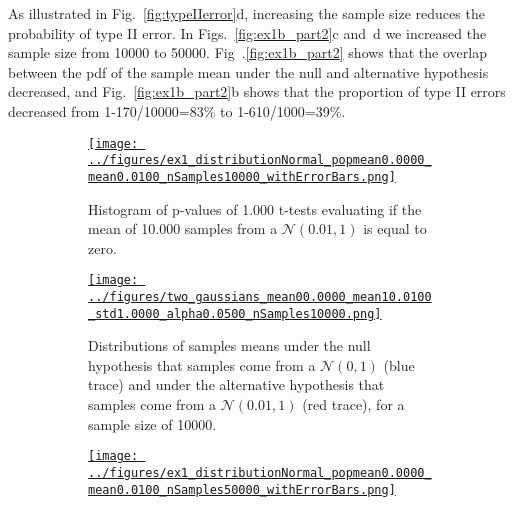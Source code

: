 \documentclass[12pt]{article}
\def\fig_width{3.5in}
\begin{document}
\begin{enumerate}[(a)]
        As illustrated in Fig.~\ref{fig:typeIIerror}d, increasing the sample
        size reduces the probability of type II error. In
        Figs.~\ref{fig:ex1b_part2}c and~d we increased the sample size from
        10000 to 50000.  Fig~.\ref{fig:ex1b_part2} shows that the overlap
        between the pdf of the sample mean under the null and alternative
        hypothesis decreased, and Fig.~\ref{fig:ex1b_part2}b shows that the
        proportion of type II errors decreased from 1-170/10000=83\% to
        1-610/1000=39\%.

        \begin{figure}[H]
            \begin{center}
                \begin{subfigure}{0.4\textwidth}
                    \centering
                    \href{https://www.gatsby.ucl.ac.uk/~rapela/neuroinformatics/2023/ws1/figures/ex1_distributionNormal_popmean0.0000_mean0.0100_nSamples10000_withErrorBars.html}{\texttt{[image: ../figures/ex1\_distributionNormal\_popmean0.0000\_mean0.0100\_nSamples10000\_withErrorBars.png]}}
                    \caption{Histogram of p-values of 1.000 t-tests evaluating if the mean
                    of 10.000 samples from a $\mathcal{N}(0.01, 1)$ is equal to zero.}
                    \label{fig:ex1b_part2_a}
                \end{subfigure}
                \hfill
                \begin{subfigure}{0.4\textwidth}
                    \centering
                    \href{https://www.gatsby.ucl.ac.uk/~rapela/neuroinformatics/2023/ws1/figures/two_gaussians_mean00.0000_mean10.0100_std1.0000_alpha0.0500_nSamples10000.html}{\texttt{[image: ../figures/two\_gaussians\_mean00.0000\_mean10.0100\_std1.0000\_alpha0.0500\_nSamples10000.png]}}
                    \caption{Distributions of samples means under the null
                    hypothesis that samples come from a $\mathcal{N}(0, 1)$
                    (blue trace) and under the alternative hypothesis that
                    samples come from a $\mathcal{N}(0.01, 1)$ (red trace), for
                    a sample size of 10000.}
                    \label{fig:ex1b_part2_b}
                \end{subfigure}
                \begin{subfigure}{0.4\textwidth}
                    \centering
                    \href{https://www.gatsby.ucl.ac.uk/~rapela/neuroinformatics/2023/ws1/figures/ex1_distributionNormal_popmean0.0000_mean0.0100_nSamples50000_withErrorBars.html}{\texttt{[image: ../figures/ex1\_distributionNormal\_popmean0.0000\_mean0.0100\_nSamples50000\_withErrorBars.png]}}

\end{subfigure}
\end{center}
\end{figure}
\end{enumerate}
\end{document}
